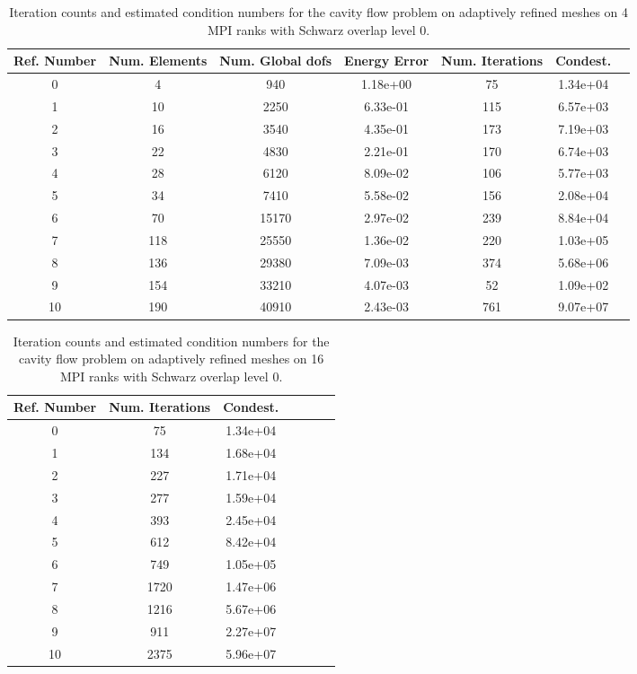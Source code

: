 \documentclass[11pt]{amsart}
\begin{document}
\begin{table}
\begin{tabular}{ c  c  c  c  c  c c}
Ref. Number	&Num. Elements	& Num. Global dofs		&Energy Error	&Num. Iterations	&Condest.\\
\hline
0	&4	&940	&1.18e+00	&   75	&1.34e+04\\
1	&10	&2250	&6.33e-01	&  115	&6.57e+03\\
2	&16	&3540	&4.35e-01	&  173	&7.19e+03\\
3	&22	&4830	&2.21e-01	&  170	&6.74e+03\\
4	&28	&6120	&8.09e-02	&  106	&5.77e+03\\
5	&34	&7410	&5.58e-02	&  156	&2.08e+04\\
6	&70	&15170	&2.97e-02	&  239	&8.84e+04\\
7	&118	&25550	&1.36e-02	&  220	&1.03e+05\\
8	&136	&29380	&7.09e-03	&  374	&5.68e+06\\
9	&154	&33210	&4.07e-03	&   52	&1.09e+02\\
10 	&190	&40910	&2.43e-03	&  761	&9.07e+07\\
\end{tabular}
\caption{Iteration counts and estimated condition numbers for the cavity flow problem on adaptively refined meshes on 4 MPI ranks with Schwarz overlap level 0.}
\label{table:stokesConditioningStudyAdaptiveMeshes4Ranks}
\end{table}


\begin{table}
\begin{tabular}{ c  c  c  c  c  c c}
Ref. Number	&Num. Iterations	&Condest.\\
\hline
0	&75	&1.34e+04\\
1	&134	&1.68e+04\\
2	&227	&1.71e+04\\
3	&277	&1.59e+04\\
4	&393	&2.45e+04\\
5	&612	&8.42e+04\\
6	&749	&1.05e+05\\
7	&1720	&1.47e+06\\
8	&1216	&5.67e+06\\
9	&911	&2.27e+07\\
10 	&2375	&5.96e+07\\
\end{tabular}
\caption{Iteration counts and estimated condition numbers for the cavity flow problem on adaptively refined meshes on 16 MPI ranks with Schwarz overlap level 0.}
\label{table:stokesConditioningStudyAdaptiveMeshes16Ranks}
\end{table}
\end{document}
